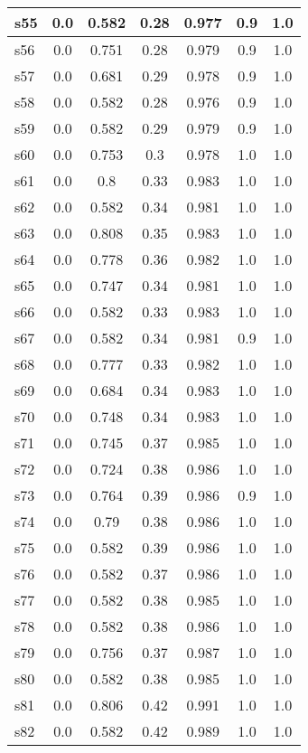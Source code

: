 \documentclass{article}
\begin{document}
\begin{tabular}{|l|c|c|c|c|c|c|}
s55 &0.0 & 0.582 & 0.28 & 0.977 & 0.9 & 1.0\\
\hline
s56 &0.0 & 0.751 & 0.28 & 0.979 & 0.9 & 1.0\\
\hline
s57 &0.0 & 0.681 & 0.29 & 0.978 & 0.9 & 1.0\\
\hline
s58 &0.0 & 0.582 & 0.28 & 0.976 & 0.9 & 1.0\\
\hline
s59 &0.0 & 0.582 & 0.29 & 0.979 & 0.9 & 1.0\\
\hline
s60 &0.0 & 0.753 & 0.3 & 0.978 & 1.0 & 1.0\\
\hline
s61 &0.0 & 0.8 & 0.33 & 0.983 & 1.0 & 1.0\\
\hline
s62 &0.0 & 0.582 & 0.34 & 0.981 & 1.0 & 1.0\\
\hline
s63 &0.0 & 0.808 & 0.35 & 0.983 & 1.0 & 1.0\\
\hline
s64 &0.0 & 0.778 & 0.36 & 0.982 & 1.0 & 1.0\\
\hline
s65 &0.0 & 0.747 & 0.34 & 0.981 & 1.0 & 1.0\\
\hline
s66 &0.0 & 0.582 & 0.33 & 0.983 & 1.0 & 1.0\\
\hline
s67 &0.0 & 0.582 & 0.34 & 0.981 & 0.9 & 1.0\\
\hline
s68 &0.0 & 0.777 & 0.33 & 0.982 & 1.0 & 1.0\\
\hline
s69 &0.0 & 0.684 & 0.34 & 0.983 & 1.0 & 1.0\\
\hline
s70 &0.0 & 0.748 & 0.34 & 0.983 & 1.0 & 1.0\\
\hline
s71 &0.0 & 0.745 & 0.37 & 0.985 & 1.0 & 1.0\\
\hline
s72 &0.0 & 0.724 & 0.38 & 0.986 & 1.0 & 1.0\\
\hline
s73 &0.0 & 0.764 & 0.39 & 0.986 & 0.9 & 1.0\\
\hline
s74 &0.0 & 0.79 & 0.38 & 0.986 & 1.0 & 1.0\\
\hline
s75 &0.0 & 0.582 & 0.39 & 0.986 & 1.0 & 1.0\\
\hline
s76 &0.0 & 0.582 & 0.37 & 0.986 & 1.0 & 1.0\\
\hline
s77 &0.0 & 0.582 & 0.38 & 0.985 & 1.0 & 1.0\\
\hline
s78 &0.0 & 0.582 & 0.38 & 0.986 & 1.0 & 1.0\\
\hline
s79 &0.0 & 0.756 & 0.37 & 0.987 & 1.0 & 1.0\\
\hline
s80 &0.0 & 0.582 & 0.38 & 0.985 & 1.0 & 1.0\\
\hline
s81 &0.0 & 0.806 & 0.42 & 0.991 & 1.0 & 1.0\\
\hline
s82 &0.0 & 0.582 & 0.42 & 0.989 & 1.0 & 1.0\\
\hline

\end{tabular}
\end{document}
